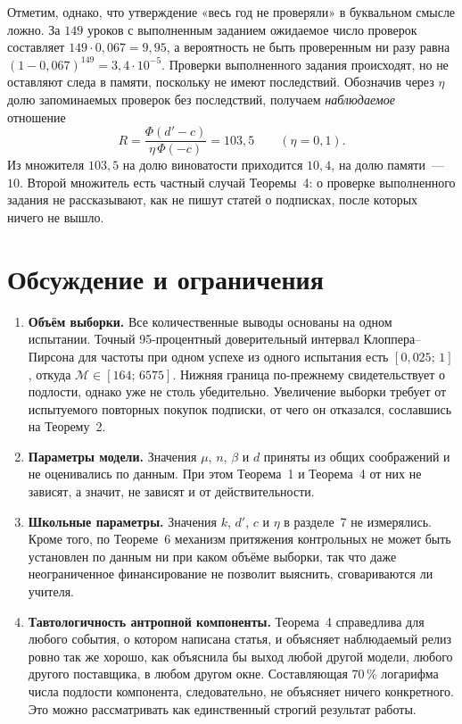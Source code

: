 \documentclass[11pt,a4paper]{article}
\newcommand{\Mp}{\mathcal{M}}
\begin{document}
Отметим, однако, что утверждение «весь год не проверяли» в буквальном смысле ложно. За $149$ уроков с выполненным заданием ожидаемое число проверок составляет $149\cdot0{,}067 = 9{,}95$, а вероятность не быть проверенным ни разу равна $(1-0{,}067)^{149} = 3{,}4\cdot10^{-5}$. Проверки выполненного задания происходят, но не оставляют следа в памяти, поскольку не имеют последствий. Обозначив через $\eta$ долю запоминаемых проверок без последствий, получаем \emph{наблюдаемое} отношение
\[
R = \frac{\Phi(d'-c)}{\eta\,\Phi(-c)} = 103{,}5 \qquad (\eta=0{,}1).
\]
Из множителя $103{,}5$ на долю виноватости приходится $10{,}4$, на долю памяти~--- $10$. Второй множитель есть частный случай Теоремы~4: о проверке выполненного задания не рассказывают, как не пишут статей о подписках, после которых ничего не вышло.

\section{Обсуждение и ограничения}

\begin{enumerate}
\item \textbf{Объём выборки.} Все количественные выводы основаны на одном испытании. Точный 95-процентный доверительный интервал Клоппера--Пирсона для частоты при одном успехе из одного испытания есть $[0{,}025;\,1]$, откуда $\Mp\in[164;\,6575]$. Нижняя граница по-прежнему свидетельствует о подлости, однако уже не столь убедительно. Увеличение выборки требует от испытуемого повторных покупок подписки, от чего он отказался, сославшись на Теорему~2.
\item \textbf{Параметры модели.} Значения $\mu$, $n$, $\beta$ и $d$ приняты из общих соображений и не оценивались по данным. При этом Теорема~1 и Теорема~4 от них не зависят, а значит, не зависят и от действительности.
\item \textbf{Школьные параметры.} Значения $k$, $d'$, $c$ и $\eta$ в разделе~7 не измерялись. Кроме того, по Теореме~6 механизм притяжения контрольных не может быть установлен по данным ни при каком объёме выборки, так что даже неограниченное финансирование не позволит выяснить, сговариваются ли учителя.
\item \textbf{Тавтологичность антропной компоненты.} Теорема~4 справедлива для любого события, о котором написана статья, и объясняет наблюдаемый релиз ровно так же хорошо, как объяснила бы выход любой другой модели, любого другого поставщика, в любом другом окне. Составляющая $70\,\%$ логарифма числа подлости компонента, следовательно, не объясняет ничего конкретного. Это можно рассматривать как единственный строгий результат работы.
\end{enumerate}
\end{document}
